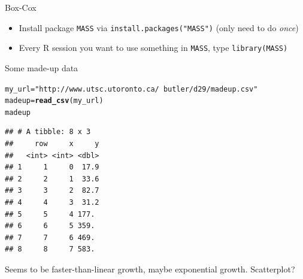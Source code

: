 \documentclass[unknownkeysallowed]{beamer}\usepackage[]{graphicx}\usepackage[]{color}
\makeatletter
\newcommand{\hlstr}[1]{\textcolor[rgb]{0.192,0.494,0.8}{#1}}%
\newcommand{\hlstd}[1]{\textcolor[rgb]{0.345,0.345,0.345}{#1}}%
\newcommand{\hlkwb}[1]{\textcolor[rgb]{0.69,0.353,0.396}{#1}}%
\newcommand{\hlkwd}[1]{\textcolor[rgb]{0.737,0.353,0.396}{\textbf{#1}}}%
\newenvironment{kframe}{%
 \def\at@end@of@kframe{}%
 \ifinner\ifhmode%
  \def\at@end@of@kframe{\end{minipage}}%
  \begin{minipage}{\columnwidth}%
 \fi\fi%
 \def\FrameCommand##1{\hskip\@totalleftmargin \hskip-\fboxsep
 \colorbox{shadecolor}{##1}\hskip-\fboxsep
     \hskip-\linewidth \hskip-\@totalleftmargin \hskip\columnwidth}%
 \MakeFramed {\advance\hsize-\width
   \@totalleftmargin\z@ \linewidth\hsize
   \@setminipage}}%
 {\par\unskip\endMakeFramed%
 \at@end@of@kframe}
\newenvironment{knitrout}{}{} %
\makeatother
\begin{document}
\begin{frame}[fragile]{Box-Cox}
  
  \begin{itemize}
  \item Install package \texttt{MASS} via
    \texttt{install.packages("MASS")} (only need to do \emph{once})
  \item Every R session you want to use something in \texttt{MASS}, type
    \texttt{library(MASS)}
    
\end{itemize}
  
\end{frame}

\begin{frame}[fragile]{Some made-up data}
  
 
\begin{knitrout}
\color{fgcolor}\begin{kframe}
\begin{alltt}
\hlstd{my_url}\hlkwb{=}\hlstr{"http://www.utsc.utoronto.ca/~butler/d29/madeup.csv"}
\hlstd{madeup}\hlkwb{=}\hlkwd{read_csv}\hlstd{(my_url)}
\hlstd{madeup}
\end{alltt}
\begin{verbatim}
## # A tibble: 8 x 3
##     row     x     y
##   <int> <int> <dbl>
## 1     1     0  17.9
## 2     2     1  33.6
## 3     3     2  82.7
## 4     4     3  31.2
## 5     5     4 177. 
## 6     6     5 359. 
## 7     7     6 469. 
## 8     8     7 583.
\end{verbatim}
\end{kframe}
\end{knitrout}
  
Seems to be faster-than-linear growth, maybe exponential growth. Scatterplot?

 

  
\end{frame}
\end{document}

